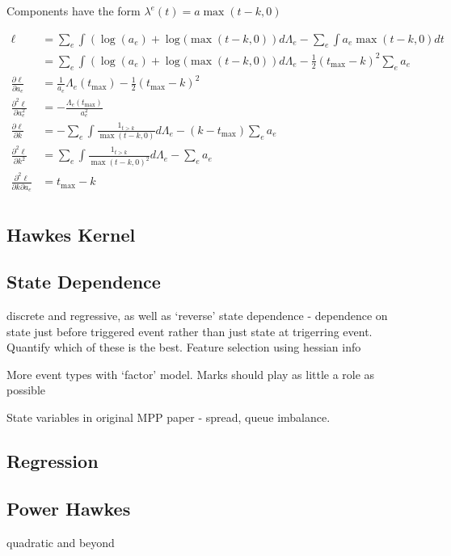 \documentclass[honours,12pt]{unswthesis}
\numberwithin{equation}{section}
\begin{document}
Components have the form $\lambda^e(t) = a\max(t-k,0)$

\begin{equation*}
	\begin{align}
		\ell &= \sum_e \int \left(\log(a_e) + \log(\max(t-k,0)\right) d\Lambda_e - \sum_e \int a_e\max(t-k,0) dt \\
			&= \sum_e \int \left(\log(a_e) + \log(\max(t-k,0)\right) d\Lambda_e - \frac{1}{2}(t_\mathrm{max} -k)^2\sum_e a_e \\
		\frac{\partial\ell}{\partial a_e} &= \frac{1}{a_e} \Lambda_e(t_\mathrm{max}) - \frac{1}{2}(t_\mathrm{max}-k)^2\\ 
		\frac{\partial^2 \ell}{\partial a_e ^2} &= -\frac{\Lambda_e(t_\mathrm{max})}{a_e^2}\\
		\frac{\partial\ell}{\partial k} &= -\sum_e \int \frac{1_{t>k}}{\max(t-k,0)} d\Lambda_e - (k-t_\mathrm{max})\sum_e a_e \\
		\frac{\partial^2\ell}{\partial k^2} &= \sum_e \int \frac{1_{t>k}}{\max(t-k,0)^2} d\Lambda_e - \sum_e a_e \\
		\frac{\partial^2\ell}{\partial k\partial a_e} &= t_\mathrm{max}-k\\
	\end{align}
\end{equation*}

\subsection{Hawkes Kernel}
\subsection{State Dependence}
discrete and regressive, as well as `reverse' state dependence - dependence on state just before triggered event rather than just state at trigerring event. Quantify which of these is the best. Feature selection using hessian info

More event types with `factor' model. Marks should play as little a role as possible

State variables in original MPP paper - spread, queue imbalance.
\subsection{Regression}

\subsection{Power Hawkes}
quadratic and beyond
\end{document}
